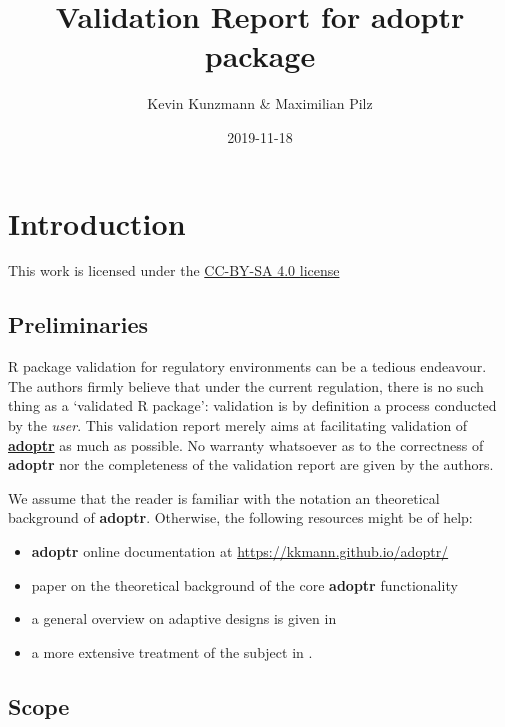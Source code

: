 \documentclass[]{book}
\title{Validation Report for \textbf{adoptr} package}
\author{Kevin Kunzmann \& Maximilian Pilz}
\date{2019-11-18}
\providecommand{\tightlist}{%
  \setlength{\itemsep}{0pt}\setlength{\parskip}{0pt}}
\begin{document}
\maketitle

{
\setcounter{tocdepth}{1}
\tableofcontents
}
\hypertarget{introduction}{%
\chapter{Introduction}\label{introduction}}

This work is licensed under the \href{https://creativecommons.org/licenses/by-sa/4.0/deed.en}{CC-BY-SA 4.0 license}

\hypertarget{preliminaries}{%
\section{Preliminaries}\label{preliminaries}}

R package validation for regulatory environments can be a
tedious endeavour.
The authors firmly believe that under the current regulation,
there is no such thing as a `validated R package':
validation is by definition a process conducted by the \emph{user}.
This validation report merely aims at facilitating
validation of \textbf{\href{https://github.com/kkmann/adoptr}{adoptr}} as
much as possible.
No warranty whatsoever as to the correctness of \textbf{adoptr} nor the
completeness of the validation report are given by the authors.

We assume that the reader is familiar with the notation an theoretical
background of \textbf{adoptr}.
Otherwise, the following resources might be of help:

\begin{itemize}
\tightlist
\item
  \textbf{adoptr} online documentation at \url{https://kkmann.github.io/adoptr/}
\item
  paper on the theoretical background of the core \textbf{adoptr} functionality \citep{variational}
\item
  a general overview on adaptive designs is given in \citep{Bauer2015}
\item
  a more extensive treatment of the subject in \citep{Wassmer2016}.
\end{itemize}

\hypertarget{scope}{%
\section{Scope}\label{scope}}
\end{document}
